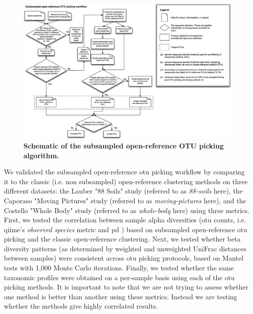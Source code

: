 \begin{figure}[htbp]
\includegraphics[width=\columnwidth]{chapter_otupicking_figures/workflow.png}
\caption[Schematic of the subsampled open-reference OTU picking algorithm]{\textbf{Schematic of the subsampled open-reference OTU picking algorithm.}}
\label{sub_open_ref_fig1}
\end{figure}

We validated the subsampled open-reference \gls{otu} picking workflow by comparing it
to the classic (i.e. non subsampled) open-reference clustering methods on three
different datasets: the Lauber "88 Soils" study \cite{Lauber2009} (referred to
as \emph{88-soils} here), the Caporaso "Moving Pictures" study \cite{Caporaso2011}
(referred to as \emph{moving-pictures} here), and the Costello "Whole Body" study
\cite{Costello2009} (referred to as \emph{whole-body} here) using three metrics.
First, we tested the correlation between sample alpha diversities (\gls{otu} counts,
i.e. \gls{qiime}'s \emph{observed species} metric and \gls{pd} \cite{Faith1992}) based
on subsampled open-reference \gls{otu} picking and the classic open-reference clustering.
Next, we tested whether beta diversity patterns (as determined by weighted and
unweighted UniFrac \cite{Lozupone2005} distances between samples) were consistent across \gls{otu}
picking protocols, based on Mantel tests \cite{Mantel1967} with 1,000 Monte Carlo iterations.
Finally, we tested whether the same taxonomic profiles were obtained on a per-sample
basis using each of the \gls{otu} picking methods. It is important to note that
we are not trying to assess whether one method is better than another using these metrics.
Instead we are testing whether the methods give highly correlated results.

